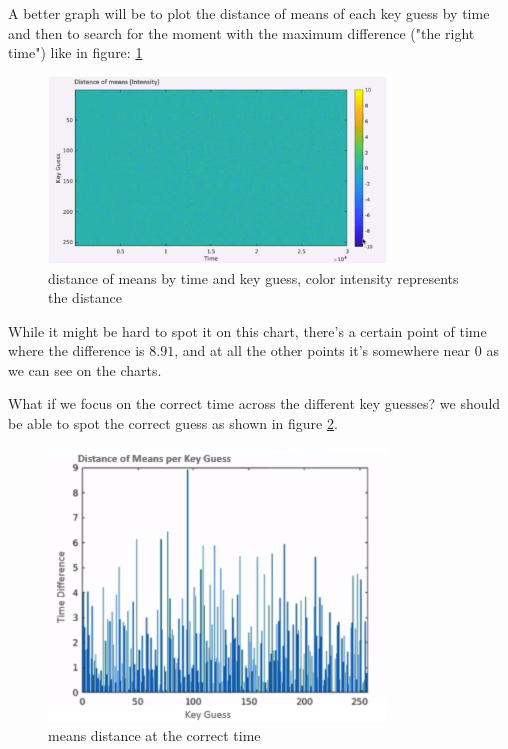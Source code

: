 A better graph will be to plot the distance of means of each key guess by time and then to search for the moment with the maximum difference ("the right time") like in figure: \ref{fig:intensity_represents_means_diff}
\begin{figure}[H]
\centering
\includegraphics[width=0.8\textwidth]{images/Lecture6/intensity_represents_means_diff.png}
\caption{distance of means by time and key guess, color intensity represents the distance}
\label{fig:intensity_represents_means_diff}
\end{figure}
While it might be hard to spot it on this chart, there's a certain point of time where the difference is $8.91$, and at all the other points it's somewhere near 0 as we can see on the charts.

What if we focus on the correct time across the different key guesses? we should be able to spot the correct guess as shown in figure \ref{fig:the-correct-time}.
\begin{figure}[H]
\centering
\includegraphics[width=0.8\textwidth]{images/Lecture6/the-correct-time.png}
\caption{means distance at the correct time}
\label{fig:the-correct-time}
\end{figure}

